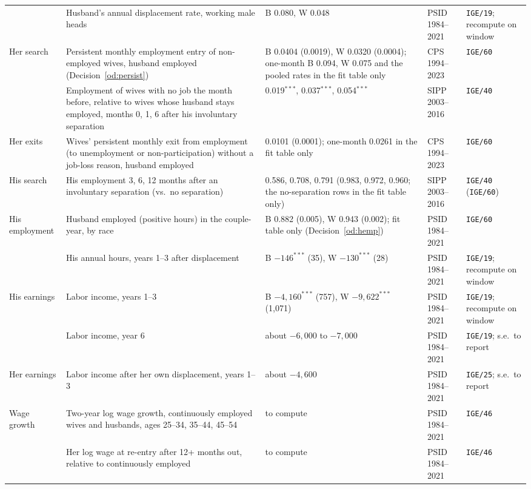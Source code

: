 \documentclass[11pt]{article}
\newcommand{\code}[1]{\texttt{#1}}
\newcommand{\1}{\mathbf{1}}
\begin{document}
\begin{longtable}{L{1.9cm}L{4.6cm}L{2.8cm}L{1.6cm}L{2.9cm}}
 & Husband's annual displacement rate, working male heads & B 0.080, W 0.048 & PSID 1984--2021 & \code{IGE/19}; recompute on window \\
Her search & Persistent monthly employment entry of non-employed wives, husband employed (Decision~\ref{od:persist}) & B 0.0404 (0.0019), W 0.0320 (0.0004); one-month B 0.094, W 0.075 and the pooled rates in the fit table only & CPS 1994--2023 & \code{IGE/60} \\
 & Employment of wives with no job the month before, relative to wives whose husband stays employed, months 0, 1, 6 after his involuntary separation & 0.019$^{***}$, 0.037$^{***}$, 0.054$^{***}$ & SIPP 2003--2016 & \code{IGE/40} \\
Her exits & Wives' persistent monthly exit from employment (to unemployment or non-participation) without a job-loss reason, husband employed & 0.0101 (0.0001); one-month 0.0261 in the fit table only & CPS 1994--2023 & \code{IGE/60} \\
His search & His employment 3, 6, 12 months after an involuntary separation (vs.\ no separation) & 0.586, 0.708, 0.791 (0.983, 0.972, 0.960; the no-separation rows in the fit table only) & SIPP 2003--2016 & \code{IGE/40} (\code{IGE/60}) \\
His employment & Husband employed (positive hours) in the couple-year, by race & B 0.882 (0.005), W 0.943 (0.002); fit table only (Decision~\ref{od:hemp}) & PSID 1984--2021 & \code{IGE/60} \\
 & His annual hours, years 1--3 after displacement & B $-146^{***}$ (35), W $-130^{***}$ (28) & PSID 1984--2021 & \code{IGE/19}; recompute on window \\
His earnings & Labor income, years 1--3 & B $-4{,}160^{***}$ (757), W $-9{,}622^{***}$ (1{,}071) & PSID 1984--2021 & \code{IGE/19}; recompute on window \\
 & Labor income, year 6 & about $-6{,}000$ to $-7{,}000$ & PSID 1984--2021 & \code{IGE/19}; s.e.\ to report \\
Her earnings & Labor income after her own displacement, years 1--3 & about $-4{,}600$ & PSID 1984--2021 & \code{IGE/25}; s.e.\ to report \\
Wage growth & Two-year log wage growth, continuously employed wives and husbands, ages 25--34, 35--44, 45--54 & to compute & PSID 1984--2021 & \code{IGE/46} \\
 & Her log wage at re-entry after 12+ months out, relative to continuously employed & to compute & PSID 1984--2021 & \code{IGE/46} \\

\end{longtable}
\end{document}
